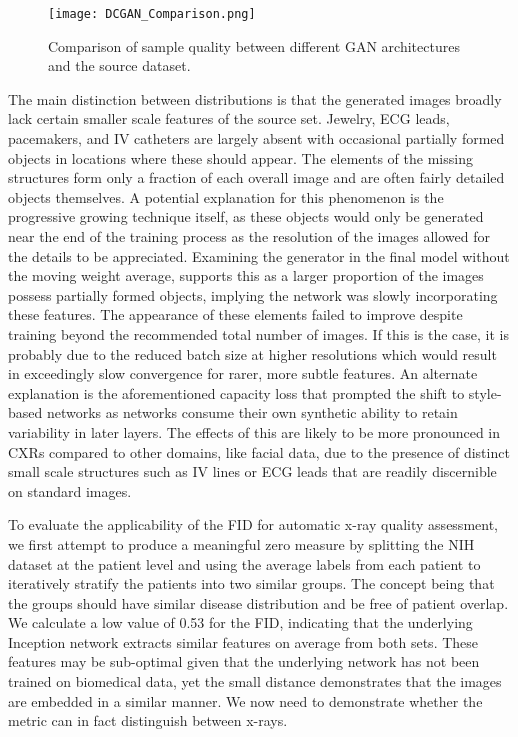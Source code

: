 \documentclass{article}
\begin{document}
\begin{figure}
    \centering
    \texttt{[image: DCGAN\_Comparison.png]}
    \caption{Comparison of sample quality between different GAN architectures and the source dataset.}
    \label{fig:DCGAN}
\end{figure}

The main distinction between distributions is that the generated images broadly lack certain smaller scale features of the source set. Jewelry, ECG leads, pacemakers, and IV catheters are largely absent with occasional partially formed objects in locations where these should appear. The elements of the missing structures form only a fraction of each overall image and are often fairly detailed objects themselves. A potential explanation for this phenomenon is the progressive growing technique itself, as these objects would only be generated near the end of the training process as the resolution of the images allowed for the details to be appreciated. Examining the generator in the final model without the moving weight average, supports this as a larger proportion of the images possess partially formed objects, implying the network was slowly incorporating these features. The appearance of these elements failed to improve despite training beyond the recommended total number of images. If this is the case, it is probably due to the reduced batch size at higher resolutions which would result in exceedingly slow convergence for rarer, more subtle features. An alternate explanation is the aforementioned capacity loss that prompted the shift to style-based networks as networks consume their own synthetic ability to retain variability in later layers. The effects of this are likely to be more pronounced in CXRs compared to other domains, like facial data, due to the presence of distinct small scale structures such as IV lines or ECG leads that are readily discernible on standard images. 

To evaluate the applicability of the FID for automatic x-ray quality assessment, we first attempt to produce a meaningful zero measure by splitting the NIH dataset at the patient level and using the average labels from each patient to iteratively stratify the patients into two similar groups. The concept being that the groups should have similar disease distribution and be free of patient overlap. We calculate a low value of \num{0.53} for the FID, indicating that the underlying Inception network extracts similar features on average from both sets. These features may be sub-optimal given that the underlying network has not been trained on biomedical data, yet the small distance demonstrates that the images are embedded in a similar manner. We now need to demonstrate whether the metric can in fact distinguish between x-rays.
\end{document}
